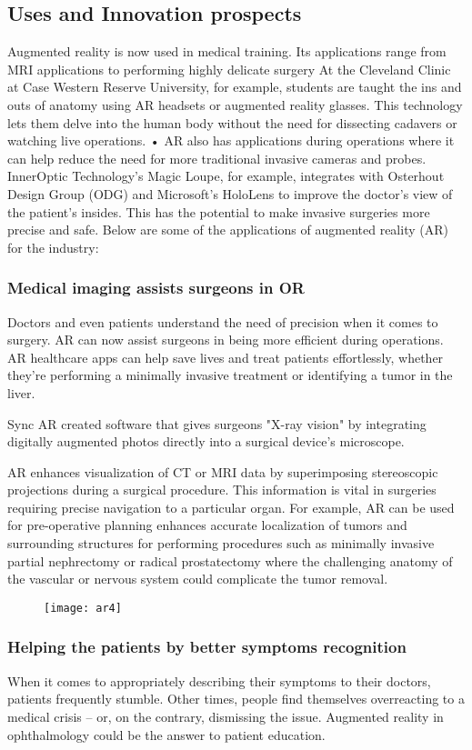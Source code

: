 \documentclass[12pt]{article}
\begin{document}
\subsection{Uses and Innovation prospects}
Augmented reality is now used in medical training. Its applications range from MRI applications to performing highly delicate surgery
At the Cleveland Clinic at Case Western Reserve University, for example, students are taught the ins and outs of anatomy using AR headsets or augmented reality glasses. This technology lets them delve into the human body without the need for dissecting cadavers or watching live operations.
•	AR also has applications during operations where it can help reduce the need for more traditional invasive cameras and probes.
InnerOptic Technology's Magic Loupe, for example, integrates with Osterhout Design Group (ODG) and Microsoft's HoloLens to improve the doctor's view of the patient's insides.
This has the potential to make invasive surgeries more precise and safe. 
Below are some of the applications of augmented reality (AR) for the industry:
\subsubsection{	Medical imaging assists surgeons in OR}
Doctors and even patients understand the need of precision when it comes to surgery. AR can now assist surgeons in being more efficient during operations. AR healthcare apps can help save lives and treat patients effortlessly, whether they're performing a minimally invasive treatment or identifying a tumor in the liver.

Sync AR created software that gives surgeons "X-ray vision" by integrating digitally augmented photos directly into a surgical device's microscope.

AR enhances visualization of CT or MRI data by superimposing stereoscopic projections during a surgical procedure. This information is vital in surgeries requiring precise navigation to a particular organ. For example, AR can be used for pre-operative planning enhances accurate localization of tumors and surrounding structures for performing procedures such as minimally invasive partial nephrectomy or radical prostatectomy where the challenging anatomy of the vascular or nervous system could complicate the tumor removal.

\begin{figure}[h]
\centering
\texttt{[image: ar4]}
\end{figure}
\subsubsection{ Helping the patients by better symptoms recognition}
When it comes to appropriately describing their symptoms to their doctors, patients frequently stumble. Other times, people find themselves overreacting to a medical crisis – or, on the contrary, dismissing the issue. Augmented reality in ophthalmology could be the answer to patient education.
\end{document}
